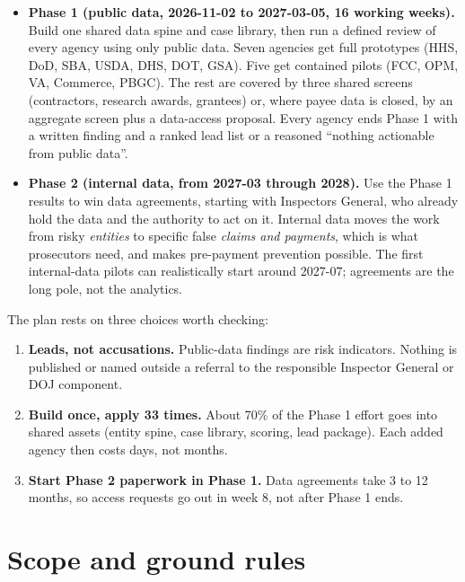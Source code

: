 \documentclass[letterpaper,11pt]{article}
\providecommand{\tightlist}{\setlength{\itemsep}{0pt}\setlength{\parskip}{0pt}}
\begin{document}
\begin{itemize}
\tightlist
\item
  \textbf{Phase 1 (public data, 2026-11-02 to 2027-03-05, 16 working
  weeks).} Build one shared data spine and case library, then run a
  defined review of every agency using only public data. Seven agencies
  get full prototypes (HHS, DoD, SBA, USDA, DHS, DOT, GSA). Five get
  contained pilots (FCC, OPM, VA, Commerce, PBGC). The rest are covered
  by three shared screens (contractors, research awards, grantees) or,
  where payee data is closed, by an aggregate screen plus a data-access
  proposal. Every agency ends Phase 1 with a written finding and a
  ranked lead list or a reasoned ``nothing actionable from public
  data''.
\item
  \textbf{Phase 2 (internal data, from 2027-03 through 2028).} Use the
  Phase 1 results to win data agreements, starting with Inspectors
  General, who already hold the data and the authority to act on it.
  Internal data moves the work from risky \emph{entities} to specific
  false \emph{claims and payments}, which is what prosecutors need, and
  makes pre-payment prevention possible. The first internal-data pilots
  can realistically start around 2027-07; agreements are the long pole,
  not the analytics.
\end{itemize}

The plan rests on three choices worth checking:

\begin{enumerate}
\def\labelenumi{\arabic{enumi}.}
\tightlist
\item
  \textbf{Leads, not accusations.} Public-data findings are risk
  indicators. Nothing is published or named outside a referral to the
  responsible Inspector General or DOJ component.
\item
  \textbf{Build once, apply 33 times.} About 70\% of the Phase 1 effort
  goes into shared assets (entity spine, case library, scoring, lead
  package). Each added agency then costs days, not months.
\item
  \textbf{Start Phase 2 paperwork in Phase 1.} Data agreements take 3 to
  12 months, so access requests go out in week 8, not after Phase 1
  ends.
\end{enumerate}

\hypertarget{scope-and-ground-rules}{%
\section{Scope and ground rules}\label{scope-and-ground-rules}}
\end{document}
